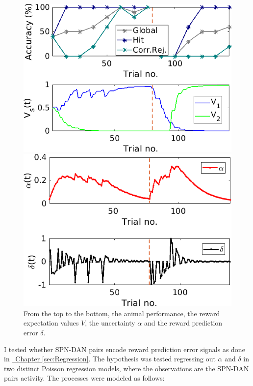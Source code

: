 \begin{figure}
    \centering
    \includegraphics[scale=0.7]{figures/PavPerfV.png}
    
    \vspace{0.5cm}
    
    \includegraphics[scale=0.7]{figures/PavAlphaDelta.png}
    \caption{From the top to the bottom, the animal performance, the reward expectation values $V$, the uncertainty $\alpha$ and the reward prediction error $\delta$.}
    \label{fig:PavRL_ex}
\end{figure}
I tested whether SPN-DAN pairs encode reward prediction error signals as done in \hyperref[sec:Regression]{~Chapter \ref*{sec:Regression}}. 
The hypothesis was tested regressing out $\alpha$ and $\delta$ in two distinct Poisson regression models, where the observations are the SPN-DAN pairs activity. The processes were modeled as follows:
